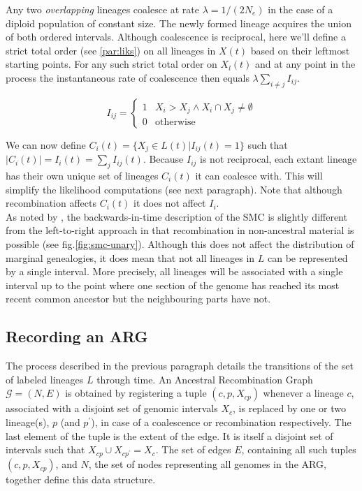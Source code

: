 \documentclass{article}
\begin{document}
Any two \emph{overlapping} lineages coalesce at rate $\lambda = 1/(2N_e)$ in the case
of a diploid population of constant size. The newly formed lineage acquires the 
union of both ordered intervals.
Although coalescence is reciprocal, here we'll define a strict total order 
(see \ref{par:liks}) on 
all lineages in $X(t)$ based on their leftmost starting points. 
For any such strict total order on $X_l(t)$ and at any point in the process 
the instantaneous rate of coalescence then equals $\lambda \sum_{i \neq j} I_{ij}$.

\begin{equation} \label{def:coal}
I_{ij} = \begin{cases}
1 & X_i > X_j \wedge X_i \cap X_j \neq \emptyset \\
0 & \text{otherwise}
\end{cases}
\end{equation}

We can now define $C_i(t) = \{X_j \in L(t) | I_{ij}(t) = 1\}$ such that $|C_i(t)| = 
I_{i}(t) = \sum_{j} I_{ij}(t)$.
Because $I_{ij}$ is not reciprocal, each extant lineage has their own unique set of 
lineages $C_i(t)$ it can coalesce with. This will simplify the likelihood computations 
(see next paragraph). Note that although recombination affects $C_i(t)$ it does not 
affect $I_{i}$.\\ 

As noted by \cite{mcvean_approximating_2005}, the backwards-in-time description of the 
SMC is slightly different from the left-to-right approach in that recombination 
in non-ancestral material is possible (see fig.\ref{fig:smc-unary}). 
Although this does not affect the distribution 
of marginal genealogies, it does mean that not all lineages in $L$ can be represented 
by a single interval. More precisely, all lineages will be associated with 
a single interval up to the point where one section of the 
genome has reached its most recent common ancestor but the neighbouring parts have not.

\subsection{Recording an ARG} \label{par:recording}

The process described in the previous paragraph details the transitions of the 
set of labeled lineages $L$ through time. An Ancestral Recombination Graph 
$\mathcal{G} = (N, E)$ is obtained by registering a tuple $(c, p, X_{cp})$ whenever a 
lineage $c$, associated with a disjoint set of genomic intervals $X_c$, is 
replaced by one or two lineage(s), $p$ (and $p^{\prime}$), 
in case of a coalescence or recombination respectively.
The last element of the tuple is the extent of the edge. It is itself a  
disjoint set of intervals such that $X_{cp} \cup X_{cp^{\prime}} = X_c$. 
The set of edges $E$, containing all such tuples $(c, p, X_{cp})$, 
and $N$, the set of nodes representing all genomes in the ARG, together
define this data structure.\\
\end{document}
